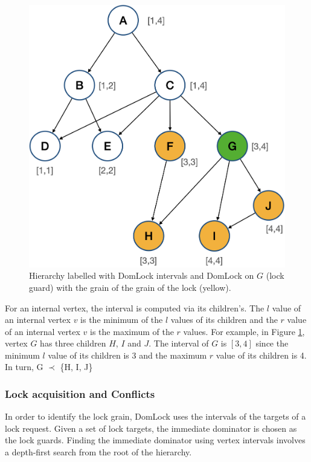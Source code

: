 \begin{figure}
    \centering
    \captionsetup{justification=centering}
    \includegraphics[width=.6\textwidth]{figures/domlock_example_with_lock.png}
    \caption{Hierarchy labelled with DomLock intervals and DomLock on $G$ (lock guard) with the grain of the grain of the lock (yellow).}
    \label{fig:domlock_example_locked}
\end{figure}

For an internal vertex, the interval is computed via its children's. The $l$ value of an internal vertex $v$ is the minimum of the $l$ values of its children and the $r$ value of an internal vertex $v$ is the maximum of the $r$ values. For example, in Figure \ref{fig:domlock_example_locked}, vertex $G$ has three children $H$, $I$ and $J$. The interval of $G$ is $[3,4]$ since the minimum $l$ value of its children is 3 and the maximum $r$ value of its children is 4.  In turn, G $\prec$ \{H, I, J\}

\subsubsection{Lock acquisition and Conflicts}

In order to identify the lock grain, DomLock uses the intervals of the targets of a lock request. Given a set of lock targets, the immediate dominator is chosen as the lock guards. Finding the immediate dominator using vertex intervals involves a depth-first search from the root of the hierarchy.  

